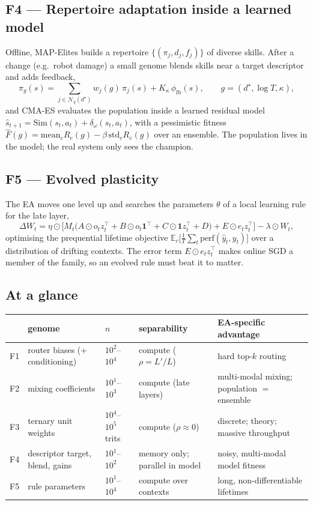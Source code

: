 \documentclass[11pt,a4paper]{article}
\theoremstyle{definition}
\theoremstyle{plain}
\theoremstyle{remark}
\newcommand{\E}{\mathbb{E}}
\begin{document}
\subsection*{F4 --- Repertoire adaptation inside a learned model}
Offline, MAP-Elites builds a repertoire $\{(\pi_j, d_j, f_j)\}$ of diverse skills. After a change (e.g.\ robot damage) a small genome blends skills near a target descriptor and adds feedback,
\begin{equation}
\pi_g(s) = \textstyle\sum_{j\in\mathcal{N}_q(d^\star)} w_j(g)\,\pi_j(s) + K_\kappa\,\phi_{\text{fb}}(s),\qquad g = (d^\star,\log T,\kappa),
\end{equation}
and CMA-ES evaluates the population inside a learned residual model $\hat s_{t+1} = \mathrm{Sim}(s_t,a_t) + \delta_\omega(s_t,a_t)$, with a pessimistic fitness $\hat F(g) = \mathrm{mean}_e R_e(g) - \beta\,\mathrm{std}_e R_e(g)$ over an ensemble. The population lives in the model; the real system only sees the champion.

\subsection*{F5 --- Evolved plasticity}
The EA moves one level up and searches the parameters $\theta$ of a local learning rule for the late layer,
\begin{equation}
\Delta W_t = \eta\odot\Big[M_t\big(A\odot o_tz_t^\top + B\odot o_t\mathbf 1^\top + C\odot \mathbf 1 z_t^\top + D\big) + E\odot e_tz_t^\top\Big] - \lambda\odot W_t,
\end{equation}
optimising the prequential lifetime objective $\E_{c}\big[\frac{1}{T}\sum_t \mathrm{perf}(\hat y_t,y_t)\big]$ over a distribution of drifting contexts. The error term $E\odot e_tz_t^\top$ makes online SGD a member of the family, so an evolved rule must beat it to matter.

\subsection*{At a glance}
\begin{center}
\small
\begin{tabularx}{\linewidth}{@{}lL{3.4cm}L{2.2cm}L{3.3cm}Y@{}}
\toprule
 & genome & $n$ & separability & EA-specific advantage \\
\midrule
F1 & router biases (+ conditioning) & $10^2$--$10^4$ & compute ($\rho=L'/L$) & hard top-$k$ routing \\
F2 & mixing coefficients & $10^1$--$10^3$ & compute (late layers) & multi-modal mixing; population $=$ ensemble \\
F3 & ternary unit weights & $10^4$--$10^5$ trits & compute ($\rho\approx0$) & discrete; theory; massive throughput \\
F4 & descriptor target, blend, gains & $10^1$--$10^2$ & memory only; parallel in model & noisy, multi-modal model fitness \\
F5 & rule parameters & $10^1$--$10^4$ & compute over contexts & long, non-differentiable lifetimes \\
\bottomrule
\end{tabularx}
\end{center}
\end{document}
